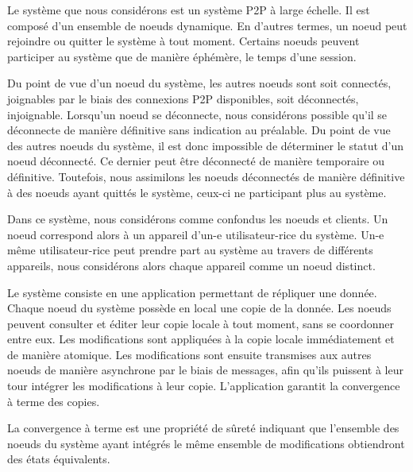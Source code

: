 \label{sec:system-model}

Le système que nous considérons est un système \acf{P2P} à large échelle.
Il est composé d'un ensemble de noeuds dynamique.
En d'autres termes, un noeud peut rejoindre ou quitter le système à tout moment.
Certains noeuds peuvent participer au système que de manière éphémère, \eg le temps d'une session.

Du point de vue d'un noeud du système, les autres noeuds sont soit connectés, \ie joignables par le biais des connexions \ac{P2P} disponibles, soit déconnectés, \ie injoignable.
Lorsqu'un noeud se déconnecte, nous considérons possible qu'il se déconnecte de manière définitive sans indication au préalable.
Du point de vue des autres noeuds du système, il est donc impossible de déterminer le statut d'un noeud déconnecté.
Ce dernier peut être déconnecté de manière temporaire ou définitive.
Toutefois, nous assimilons les noeuds déconnectés de manière définitive à des noeuds ayant quittés le système, ceux-ci ne participant plus au système.

Dans ce système, nous considérons comme confondus les noeuds et clients.
Un noeud correspond alors à un appareil d'un-e utilisateur-rice du système.
Un-e même utilisateur-rice peut prendre part au système au travers de différents appareils, nous considérons alors chaque appareil comme un noeud distinct.

Le système consiste en une application permettant de répliquer une donnée.
Chaque noeud du système possède en local une copie de la donnée.
Les noeuds peuvent consulter et éditer leur copie locale à tout moment, sans se coordonner entre eux.
Les modifications sont appliquées à la copie locale immédiatement et de manière atomique.
Les modifications sont ensuite transmises aux autres noeuds de manière asynchrone par le biais de messages, afin qu'ils puissent à leur tour intégrer les modifications à leur copie.
L'application garantit la convergence à terme des copies.

\begin{definition}
    \label{def:eventual-consistency}
    La convergence à terme est une propriété de sûreté indiquant que l'ensemble des noeuds du système ayant intégrés le même ensemble de modifications obtiendront des états équivalents\footnotemark.
\end{definition}

